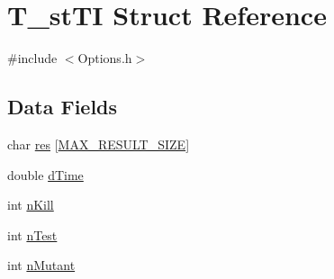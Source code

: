 \hypertarget{structT__stTI}{\section{T\-\_\-st\-T\-I Struct Reference}
\label{structT__stTI}
}


{\ttfamily \#include $<$Options.\-h$>$}

\subsection*{Data Fields}
\begin{DoxyCompactItemize}
\item 
char \hyperlink{structT__stTI_ac05a161709d3f1eec760d11aa13fc0b7}{res} \mbox{[}\hyperlink{Options_8h_ae9b9a76449e4c445a7462cedf31b5805}{M\-A\-X\-\_\-\-R\-E\-S\-U\-L\-T\-\_\-\-S\-I\-Z\-E}\mbox{]}
\item 
double \hyperlink{structT__stTI_ac66faf2192de9672574effb26319b45f}{d\-Time}
\item 
int \hyperlink{structT__stTI_ad62dfc2b1cd7514a9d587d2869972be7}{n\-Kill}
\item 
int \hyperlink{structT__stTI_a961acc1a141fcef1ccd9c5e492c5b2a9}{n\-Test}
\item 
int \hyperlink{structT__stTI_a4a30d643762e8a2c31455bc188395496}{n\-Mutant}
\end{DoxyCompactItemize}


